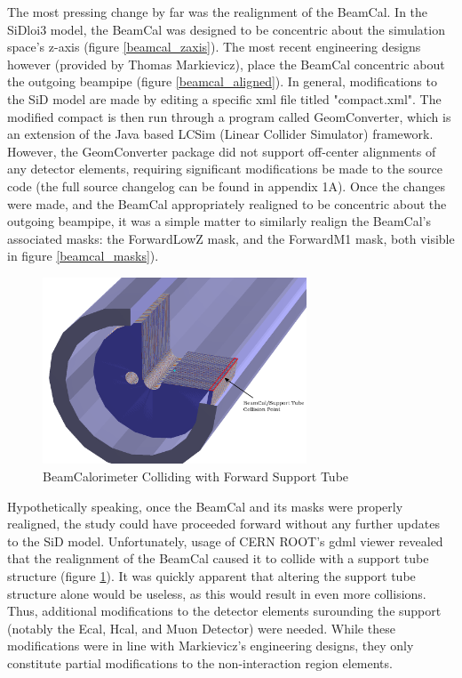 \documentclass{report}
\begin{document}
            The most pressing change by far was the realignment of the BeamCal. In the SiDloi3 model, the BeamCal was designed to be concentric about the simulation space's z-axis (figure \ref{beamcal_zaxis}). The most recent engineering designs however (provided by Thomas Markievicz), place the BeamCal concentric about the outgoing beampipe (figure \ref{beamcal_aligned}). In general, modifications to the SiD model are made by editing a specific xml file titled "compact.xml". The modified compact is then run through a program called GeomConverter, which is an extension of the Java based LCSim (Linear Collider Simulator) framework. However, the GeomConverter package did not support off-center alignments of any detector elements, requiring significant modifications be made to the source code (the full source changelog can be found in appendix 1A). Once the changes were made, and the BeamCal appropriately realigned to be concentric about the outgoing beampipe, it was a simple matter to similarly realign the BeamCal's associated masks: the ForwardLowZ mask, and the ForwardM1 mask, both visible in figure \ref{beamcal_masks}). 

            \begin{figure}[h] 
                \includegraphics[width=0.7\textwidth]{beamcal_collide}
                \centering
                \caption{BeamCalorimeter Colliding with Forward Support Tube}
                \label{beamcal_collide}
            \end{figure}

            Hypothetically speaking, once the BeamCal and its masks were properly realigned, the study could have proceeded forward without any further updates to the SiD model. Unfortunately, usage of CERN ROOT's gdml viewer revealed that the realignment of the BeamCal caused it to collide with a support tube structure (figure \ref{beamcal_collide}). It was quickly apparent that altering the support tube structure alone would be useless, as this would result in even more collisions. Thus, additional modifications to the detector elements surounding the support (notably the Ecal, Hcal, and Muon Detector) were needed. While these modifications were in line with Markievicz's engineering designs, they only constitute partial modifications to the non-interaction region elements.
\end{document}
